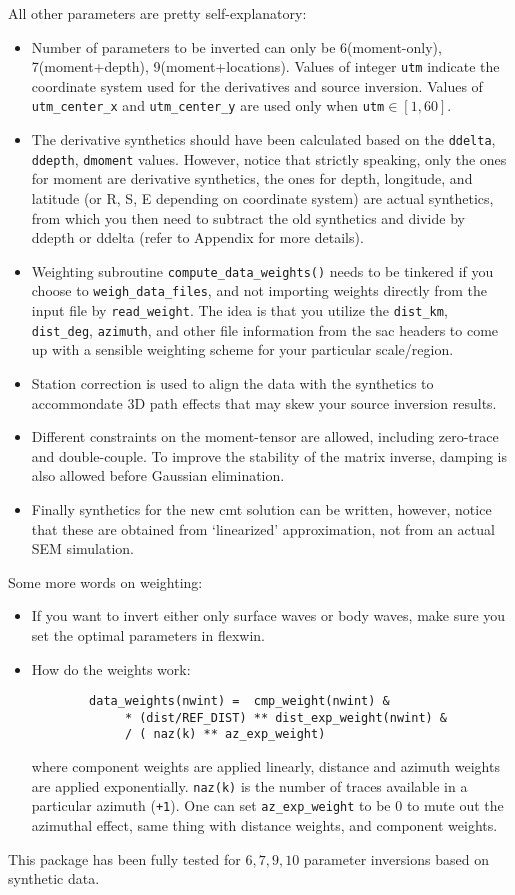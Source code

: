 \documentclass[12pt,titlepage,fleqn]{article}
\begin{document}
All other parameters are pretty self-explanatory:
\begin{itemize}
 \item Number of parameters to be inverted can only be 6(moment-only), 7(moment+depth), 9(moment+locations). Values of integer \verb+utm+ indicate the coordinate system used for the derivatives and source inversion. Values of \verb+utm_center_x+ and \verb+utm_center_y+ are used only when \verb+utm+$\in [1,60]$.
 \item The derivative synthetics should have been calculated based on the \verb=ddelta=, \verb=ddepth=, \verb=dmoment= values. However, notice that strictly speaking, only the ones for moment are derivative synthetics, the ones for depth, longitude, and latitude (or R, S, E depending on coordinate system) are actual synthetics, from which you then need to subtract the old synthetics and divide by ddepth or ddelta (refer to Appendix for more details). 
 \item Weighting subroutine \verb=compute_data_weights()=  needs to be tinkered if you choose to \verb=weigh_data_files=, and not importing weights directly from the input file by \verb=read_weight=. The idea is that you utilize the \verb=dist_km=, \verb=dist_deg=, \verb=azimuth=, and other file information from the sac headers to come up with a sensible weighting scheme for your particular scale/region.
 \item Station correction is used to align the data with the synthetics to accommondate 3D path effects that may skew your source inversion results.
 \item Different constraints on the moment-tensor are allowed, including zero-trace and double-couple. To improve the stability of the matrix inverse, damping is also allowed before Gaussian elimination.
 \item Finally synthetics for the new cmt solution can be written, however, notice that these are obtained from `linearized' approximation, not from an actual SEM simulation.
 \end{itemize}

Some more words on weighting:
\begin{itemize}
\item If you want to invert either only surface waves or body waves, make sure you set the optimal parameters in flexwin.

\item How do the weights work:
\begin{verbatim}
        data_weights(nwint) =  cmp_weight(nwint) &
             * (dist/REF_DIST) ** dist_exp_weight(nwint) &
             / ( naz(k) ** az_exp_weight)
\end{verbatim}
 where component weights are applied linearly, distance and azimuth weights are applied exponentially. \verb=naz(k)= is the number of traces available in a particular azimuth (\verb=+1=). One can set \verb=az_exp_weight= to be 0 to mute out the azimuthal effect, same thing with distance weights, and component weights.

\end{itemize}
This package has been fully tested for $6,7,9,10$ parameter inversions based on synthetic data.
\end{document}
